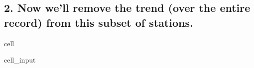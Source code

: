 \documentclass[letterpaper,10pt,english]{jupyterBook}
\begin{document}
\subsection{2. Now we’ll remove the trend (over the entire record) from this subset of stations.}
\label{\detokenize{notebooks/regional_and_local/SL_anomaly_annual:now-we-ll-remove-the-trend-over-the-entire-record-from-this-subset-of-stations}}
\begin{sphinxuseclass}{cell}\begin{sphinxVerbatimInput}

\begin{sphinxuseclass}{cell_input}
\begin{sphinxVerbatim}[commandchars=\\\{\}]
    \PYG{p}{[}\PYG{p}{]}

\PYG{p}{[}\PYG{p}{]}  \PYG{p}{[}\PYG{p}{]}  
\end{sphinxVerbatim}

\end{sphinxuseclass}\end{sphinxVerbatimInput}

\end{sphinxuseclass}
\end{document}
